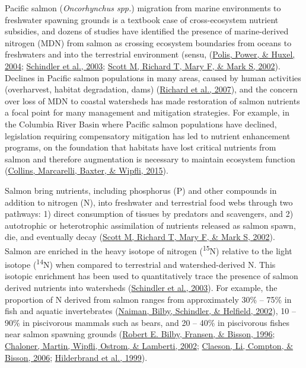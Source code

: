 \documentclass [11pt, proquest] {uwthesis}[2015/03/03]
\begin{document}
Pacific salmon (\emph{Oncorhynchus spp.}) migration from marine environments to freshwater spawning grounds is a textbook case of cross-ecosystem nutrient subsidies, and dozens of studies have identified the presence of marine-derived nitrogen (MDN) from salmon as crossing ecosystem boundaries from oceans to freshwaters and into the terrestrial environment (sensu, (\protect\hyperlink{ref-Polis2004}{Polis, Power, \& Huxel, 2004}; \protect\hyperlink{ref-Schindler2003}{Schindler et al., 2003}; \protect\hyperlink{ref-Gende2002}{Scott M, Richard T, Mary F, \& Mark S, 2002}). Declines in Pacific salmon populations in many areas, caused by human activities (overharvest, habitat degradation, dams) (\protect\hyperlink{ref-Gustafson2007}{Richard et al., 2007}), and the concern over loss of MDN to coastal watersheds has made restoration of salmon nutrients a focal point for many management and mitigation strategies. For example, in the Columbia River Basin where Pacific salmon populations have declined, legislation requiring compensatory mitigation has led to nutrient enhancement programs, on the foundation that habitats have lost critical nutrients from salmon and therefore augmentation is necessary to maintain ecosystem function (\protect\hyperlink{ref-Collins2015}{Collins, Marcarelli, Baxter, \& Wipfli, 2015}).

Salmon bring nutrients, including phosphorus (P) and other compounds in addition to nitrogen (N), into freshwater and terrestrial food webs through two pathways: 1) direct consumption of tissues by predators and scavengers, and 2) autotrophic or heterotrophic assimilation of nutrients released as salmon spawn, die, and eventually decay (\protect\hyperlink{ref-Gende2002}{Scott M, Richard T, Mary F, \& Mark S, 2002}). Salmon are enriched in the heavy isotope of nitrogen (\textsuperscript{15}N) relative to the light isotope (\textsuperscript{14}N) when compared to terrestrial and watershed-derived N. This isotopic enrichment has been used to quantitatively trace the presence of salmon derived nutrients into watersheds (\protect\hyperlink{ref-Schindler2003}{Schindler et al., 2003}). For example, the proportion of N derived from salmon ranges from approximately 30\% -- 75\% in fish and aquatic invertebrates (\protect\hyperlink{ref-Naiman2002}{Naiman, Bilby, Schindler, \& Helfield, 2002}), 10 -- 90\% in piscivorous mammals such as bears, and 20 -- 40\% in piscivorous fishes near salmon spawning grounds (\protect\hyperlink{ref-Bilby1996}{Robert E. Bilby, Fransen, \& Bisson, 1996}; \protect\hyperlink{ref-Chaloner2002}{Chaloner, Martin, Wipfli, Ostrom, \& Lamberti, 2002}; \protect\hyperlink{ref-Claeson2006}{Claeson, Li, Compton, \& Bisson, 2006}; \protect\hyperlink{ref-Hilderbrand1999}{Hilderbrand et al., 1999}).
\end{document}
